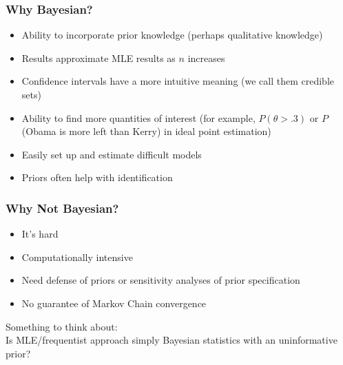 \documentclass[handout]{beamer}
\begin{document}
\begin{frame}
\frametitle{Why Bayesian?}
\pause
\begin{itemize}
\item Ability to incorporate prior knowledge (perhaps qualitative knowledge)
\pause
\item Results approximate MLE results as $n$ increases
\pause
\item Confidence intervals have a more intuitive meaning (we call them
credible sets)
\pause
\item Ability to find more quantities of interest (for example,
$P(\theta > .3)$ or $P$(Obama is more left than Kerry) in ideal point estimation)
\pause 
\item Easily set up and estimate difficult models
\pause
\item Priors often help with identification
\end{itemize}
\end{frame}

\begin{frame}
\frametitle{Why Not Bayesian?}
\pause
\begin{itemize}
\item It's hard
\pause
\item Computationally intensive
\pause
\item Need defense of priors or sensitivity analyses of prior specification
\pause
\item No guarantee of Markov Chain convergence
\end{itemize}
\pause
\bigskip
Something to think about:\\
\bigskip
Is MLE/frequentist approach simply Bayesian statistics with an uninformative prior?
\end{frame}
\end{document}
